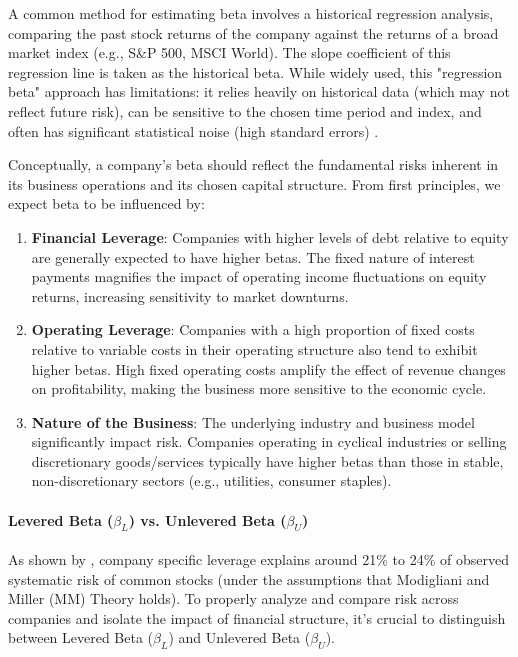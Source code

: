 A common method for estimating beta involves a historical regression analysis, comparing the past stock returns of the company against the returns of a broad market index (e.g., S\&P 500, MSCI World). The slope coefficient of this regression line is taken as the historical beta. While widely used, this "regression beta" approach has limitations: it relies heavily on historical data (which may not reflect future risk), can be sensitive to the chosen time period and index, and often has significant statistical noise (high standard errors) \parencite{damodaran_risk_parameters}.

Conceptually, a company's beta should reflect the fundamental risks inherent in its business operations and its chosen capital structure. From first principles, we expect beta to be influenced by:
\begin{enumerate}
    \item \textbf{Financial Leverage}: Companies with higher levels of debt relative to equity are generally expected to have higher betas. The fixed nature of interest payments magnifies the impact of operating income fluctuations on equity returns, increasing sensitivity to market downturns.
    \item \textbf{Operating Leverage}: Companies with a high proportion of fixed costs relative to variable costs in their operating structure also tend to exhibit higher betas. High fixed operating costs amplify the effect of revenue changes on profitability, making the business more sensitive to the economic cycle.
    \item \textbf{Nature of the Business}: The underlying industry and business model significantly impact risk. Companies operating in cyclical industries or selling discretionary goods/services typically have higher betas than those in stable, non-discretionary sectors (e.g., utilities, consumer staples).
\end{enumerate}

\paragraph{Levered Beta (\(\beta_L\)) vs. Unlevered Beta (\(\beta_U\))}
As shown by \textcite{hamada1972beta}, company specific leverage explains around 21\% to 24\% of observed systematic risk of common stocks (under the assumptions that Modigliani and Miller (MM) Theory holds).
To properly analyze and compare risk across companies and isolate the impact of financial structure, it's crucial to distinguish between Levered Beta (\(\beta_L\)) and Unlevered Beta (\(\beta_U\)).

